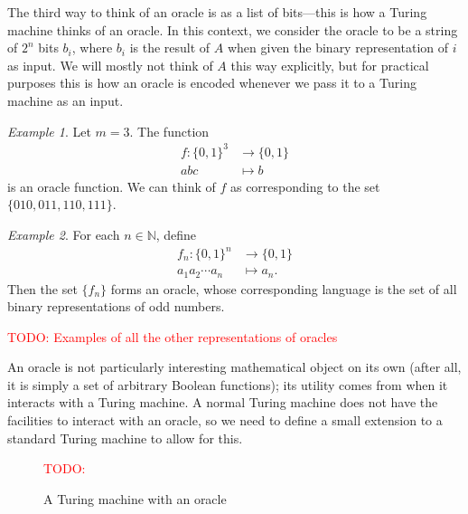 \documentclass[english,12pt]{reedthesis}
\theoremstyle{plain}
\theoremstyle{definition}
\theoremstyle{remark}
\newtheorem{example}{Example}[thm]
\newcommand{\TODO}[1]{\textcolor{red}{TODO: #1}}
\begin{document}
The third way to think of an oracle is as a list of bits---this is how a Turing
machine thinks of an oracle. In this context, we consider the oracle to be a
string of $2^{n}$ bits $b_{i}$, where $b_{i}$ is the result of $A$ when given
the binary representation of $i$ as input. We will mostly not think of $A$ this
way explicitly, but for practical purposes this is how an oracle is encoded
whenever we pass it to a Turing machine as an input.

\begin{example}\label{ex:oracle-function}
  Let $m = 3$. The function
  \begin{equation}
    \begin{aligned}
      f\colon \{0, 1\}^{3} &\rightarrow \{0, 1\} \\
      abc &\mapsto b
    \end{aligned}
  \end{equation}
  is an oracle function. We can think of $f$ as corresponding to the set
  $\{010, 011, 110, 111\}$.
\end{example}

\begin{example}\label{ex:oracle-full}
  For each $n \in \mathbb{N}$, define
  \begin{equation}
    \begin{aligned}
      f_{n}\colon \{0, 1\}^{n} &\rightarrow \{0, 1\} \\
      a_{1}a_{2} \cdots a_{n} &\mapsto a_{n}.
    \end{aligned}
  \end{equation}
  Then the set $\{f_{n}\}$ forms an oracle, whose corresponding language is the
  set of all binary representations of odd numbers.
\end{example}

\TODO{Examples of all the other representations of oracles}

An oracle is not particularly interesting mathematical object on its own (after
all, it is simply a set of arbitrary Boolean functions); its utility comes from
when it interacts with a Turing machine. A normal Turing machine does not have
the facilities to interact with an oracle, so we need to define a small
extension to a standard Turing machine to allow for this.

\begin{figure}[htbp]
  \TODO{}
  \caption{A Turing machine with an oracle}\label{fig:tm-oracle}
\end{figure}
\end{document}
